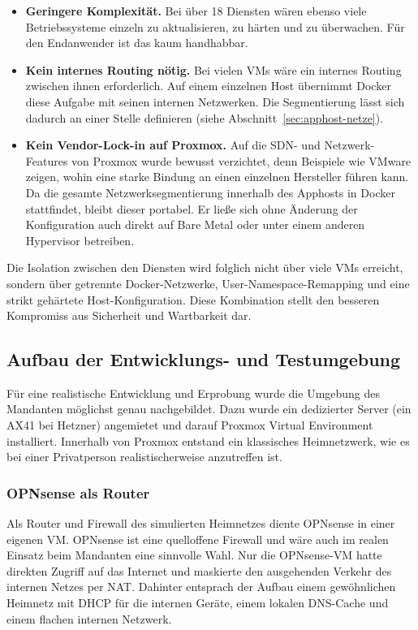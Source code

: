 \begin{itemize}
  \item \textbf{Geringere Komplexität.} Bei über 18 Diensten wären ebenso
    viele Betriebssysteme einzeln zu aktualisieren, zu härten und zu
    überwachen. Für den Endanwender ist das kaum handhabbar.
  \item \textbf{Kein internes Routing nötig.} Bei vielen \acp{VM} wäre ein
    internes Routing zwischen ihnen erforderlich. Auf einem einzelnen Host
    übernimmt Docker diese Aufgabe mit seinen internen Netzwerken. Die
    Segmentierung lässt sich dadurch an einer Stelle definieren (siehe
    Abschnitt~\ref{sec:apphost-netze}).
  \item \textbf{Kein Vendor-Lock-in auf Proxmox.} Auf die \ac{SDN}- und
    Netzwerk-Features von Proxmox wurde bewusst verzichtet, denn Beispiele
    wie VMware zeigen, wohin eine starke Bindung an einen einzelnen
    Hersteller führen kann. Da die gesamte Netzwerksegmentierung innerhalb
    des Apphosts in Docker stattfindet, bleibt dieser portabel. Er ließe sich
    ohne Änderung der Konfiguration auch direkt auf Bare Metal oder unter
    einem anderen Hypervisor betreiben.
\end{itemize}

Die Isolation zwischen den Diensten wird folglich nicht über viele \acp{VM}
erreicht, sondern über getrennte Docker-Netzwerke, User-Namespace-Remapping
und eine strikt gehärtete Host-Konfiguration. Diese Kombination stellt den
besseren Kompromiss aus Sicherheit und Wartbarkeit dar.

\subsection{Aufbau der Entwicklungs- und Testumgebung}

Für eine realistische Entwicklung und Erprobung wurde die Umgebung des
Mandanten möglichst genau nachgebildet. Dazu wurde ein dedizierter Server (ein
AX41 bei Hetzner) angemietet und darauf Proxmox Virtual Environment
installiert. Innerhalb von Proxmox entstand ein klassisches Heimnetzwerk, wie
es bei einer Privatperson realistischerweise anzutreffen ist.

\subsubsection*{OPNsense als Router}

Als Router und Firewall des simulierten Heimnetzes diente OPNsense in einer
eigenen \ac{VM}. OPNsense ist eine quelloffene Firewall und wäre auch im
realen Einsatz beim Mandanten eine sinnvolle Wahl. Nur die OPNsense-\ac{VM}
hatte direkten Zugriff auf das Internet und maskierte den ausgehenden Verkehr
des internen Netzes per \ac{NAT}. Dahinter entsprach der Aufbau einem
gewöhnlichen Heimnetz mit \ac{DHCP} für die internen Geräte, einem lokalen
\ac{DNS}-Cache und einem flachen internen Netzwerk.


